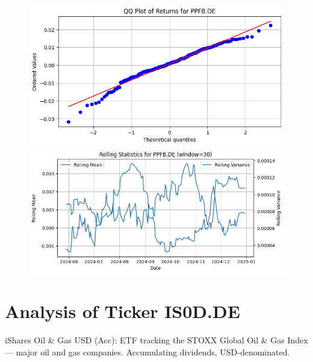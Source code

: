 \documentclass{article}%
\begin{document}
%


\begin{figure}[htbp]%
\begin{minipage}{0.31\textwidth}%
\includegraphics[width=\linewidth]{ticker_images/PPFB.DE_qq_plot.png}%
\end{minipage}%
\begin{minipage}{0.31\textwidth}%
\includegraphics[width=\linewidth]{ticker_images/PPFB.DE_rolling_stats.png}%
\end{minipage}%
\end{figure}

%
\section*{Analysis of Ticker IS0D.DE}%
\label{sec:AnalysisofTickerIS0D.DE}%
iShares Oil \& Gas USD (Acc): ETF tracking the STOXX Global Oil \& Gas Index — major oil and gas companies. Accumulating dividends, USD‑denominated.%
\end{document}
